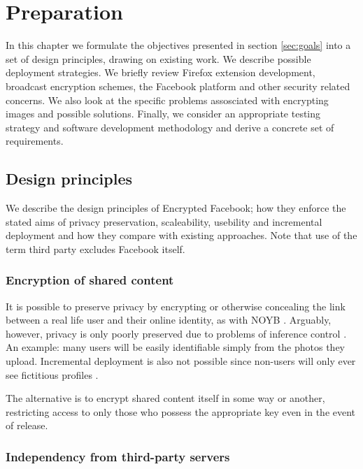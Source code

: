 \chapter{Preparation}\label{ch:preparation}

In this chapter we formulate the objectives presented in section \ref{sec:goals} into a set of design principles, drawing on existing work. We describe possible deployment strategies. We briefly review Firefox extension development, broadcast encryption schemes, the Facebook platform and other security related concerns. We also look at the specific problems assosciated with encrypting images and possible solutions. Finally, we consider an appropriate testing strategy and software development methodology and derive a concrete set of requirements.



\section{Design principles}


We describe the design principles of Encrypted Facebook; how they enforce the stated aims of privacy preservation, scaleability, usebility and incremental deployment and how they compare with existing approaches. Note that use of the term third party excludes Facebook itself.


\subsection{Encryption of shared content}

It is possible to preserve privacy by encrypting or otherwise concealing the link between a real life user and their online identity, as with NOYB \cite{noyb}. Arguably, however, privacy is only poorly preserved due to problems of inference control \cite{ross}. An example: many users will be easily identifiable simply from the photos they upload. Incremental deployment is also not possible since non-users will only ever see fictitious profiles \cite{facecloak}.

The alternative is to encrypt shared content itself in some way or another, restricting access to only those who possess the appropriate key even in the event of release.


\subsection{Independency from third-party servers}

